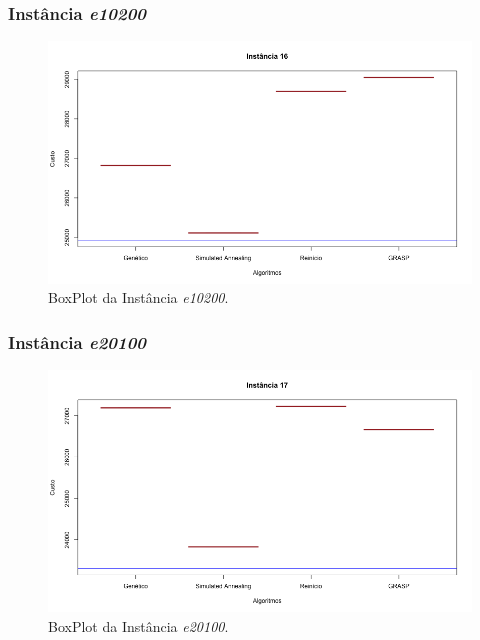 \documentclass[portugues, brazil, a4paper,12pt]{article}
\begin{document}
		\subsubsection{Instância \textit{e10200}}
			\begin{figure}[H]
				\centering
				\includegraphics[width=1\linewidth]{img/16.png}
				\caption{BoxPlot da Instância \textit{e10200}.}
				\label{fig:e10200}
			\end{figure}
	
		\subsubsection{Instância \textit{e20100}}
			\begin{figure}[H]
				\centering
				\includegraphics[width=1\linewidth]{img/17.png}
				\caption{BoxPlot da Instância \textit{e20100}.}
				\label{fig:e20100}
			\end{figure}
	
\end{document}
